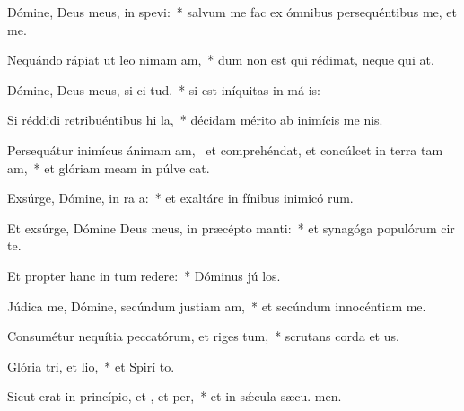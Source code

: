 \item Dómine, Deus meus, in  spevi:~* salvum me fac ex ómnibus persequéntibus me, et  me.
\item Nequándo rápiat ut leo nimam am,~* dum non est qui rédimat, neque qui  at.
\item Dómine, Deus meus, si ci tud.~* si est iníquitas in má is:
\item Si réddidi retribuéntibus hi la,~* décidam mérito ab inimícis me nis.
\item Persequátur inimícus ánimam am,~\pscross{} et comprehéndat, et concúlcet in terra tam am,~* et glóriam meam in púlve cat.
\item Exsúrge, Dómine, in ra a:~* et exaltáre in fínibus inimicó rum.
\item Et exsúrge, Dómine Deus meus, in præcépto  manti:~* et synagóga populórum cir te.
\item Et propter hanc in tum redere:~* Dóminus jú los.
\item Júdica me, Dómine, secúndum justiam am,~* et secúndum innocéntiam   me.
\item Consumétur nequítia peccatórum, et riges tum,~* scrutans corda et  us.
\item Glória tri, et lio,~* et Spirí to.
\item Sicut erat in princípio, et , et per,~* et in sǽcula sæcu. men.
